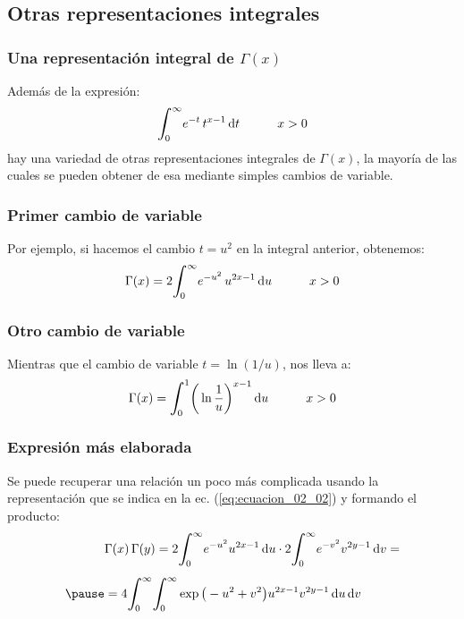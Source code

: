 \documentclass[12pt]{beamer}
\begin{document}
\subsection{Otras representaciones integrales}

\begin{frame}
\frametitle{Una representación integral de $\Gamma (x)$}
Además de la expresión:
\pause
\begin{align*}
\scaleint{6ex}_{\bs 0}^{\infty} e^{-t} \, t^{x- 1} \dd{t} \hspace{1cm} x > 0
\end{align*}
hay una variedad de otras representaciones integrales de $\Gamma (x)$, la mayoría de las cuales se pueden obtener de esa mediante simples cambios de variable.
\end{frame}
\begin{frame}
\frametitle{Primer cambio de variable}
Por ejemplo, si hacemos el cambio $t = u^{2}$ en la integral anterior, obtenemos:
\pause
\begin{align}
\Gamma (x) = 2 \scaleint{6ex}_{\bs 0}^{\infty} e^{-u^{2}} \, u^{2x-1} \dd{u} \hspace{1cm} x > 0
\label{eq:ecuacion_02_20}
\end{align}
\end{frame}
\begin{frame}
\frametitle{Otro cambio de variable}
Mientras que el cambio de variable $t = \ln (1/u)$, nos lleva a:
\pause
\begin{align}
\Gamma (x) = \scaleint{6ex}_{\bs 0}^{1} \bigg( \ln \dfrac{1}{u} \bigg)^{x-1} \dd{u} \hspace{1cm} x > 0
\label{eq:ecuacion_02_21}
\end{align}
\end{frame}
\begin{frame}
\frametitle{Expresión más elaborada}
Se puede recuperar una relación un poco más complicada usando la representación que se indica en la ec. (\ref{eq:ecuacion_02_02}) y formando el producto:
\pause
\begin{eqnarray*}
\begin{aligned}
&\Gamma (x) \, \Gamma(y) = 2 \scaleint{6ex}_{\bs 0}^{\infty} e^{-u^{2}} u^{2x-1} \dd{u} \cdot 2 \scaleint{6ex}_{\bs 0}^{\infty} e^{-v^{2}} v^{2y-1} \dd{v} = \\[0.5em] \pause
&= 4 \scaleint{6ex}_{\bs 0}^{\infty} \scaleint{6ex}_{\bs 0}^{\infty} \exp\big( - u^{2} + v^{2} \big) u^{2x-1} v^{2y-1} \dd{u} \dd{v}
\end{aligned}
\end{eqnarray*}
\end{frame}
\end{document}
